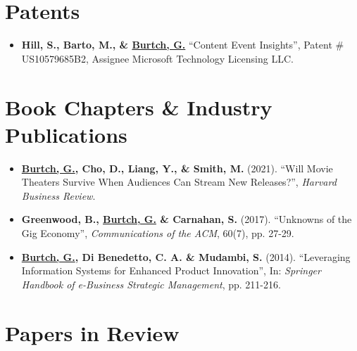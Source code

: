 \documentclass[10.5pt,letterpaper,sans]{moderncv}        %
\begin{document}
\section{Patents}

\begin{itemize}[leftmargin=!,labelindent=5pt,itemindent=-15pt]

\item \textbf{Hill, S., Barto, M., \& \underline{Burtch, G.}} ``Content Event Insights'', Patent \# US10579685B2, Assignee\: Microsoft Technology Licensing LLC.

\end{itemize}

\vspace{4 pt}

\section{Book Chapters \& Industry Publications}

\smallskip

\begin{itemize}[leftmargin=!,labelindent=5pt,itemindent=-15pt]

\item \textbf{\underline{Burtch, G.}, Cho, D., Liang, Y., \& Smith, M.} (2021). ``Will Movie Theaters Survive When Audiences Can Stream New Releases?'', \textit{Harvard Business Review}.

\item \textbf{Greenwood, B., \underline{Burtch, G.} \& Carnahan, S.} (2017). ``Unknowns of the Gig Economy'', \textit{Communications of the ACM}, 60(7), pp. 27-29.

\item \textbf{\underline{Burtch, G.}, Di Benedetto, C. A. \& Mudambi, S.} (2014). ``Leveraging Information Systems for Enhanced Product Innovation'', In: \textit{Springer Handbook of e-Business Strategic Management}, pp. 211-216.

\end{itemize}

\section{Papers in Review}
\end{document}
